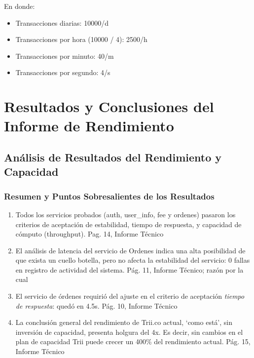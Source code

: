 \documentclass[
  paper=a4,
  ,captions=tableheading
]{scrartcl}
\providecommand{\tightlist}{%
  \setlength{\itemsep}{0pt}\setlength{\parskip}{0pt}}
\renewenvironment{quote}{\begin{customblockquote}\list{}{\rightmargin=0em\leftmargin=0em}%
\item\relax\color{blockquote-text}\ignorespaces}{\unskip\unskip\endlist\end{customblockquote}}
\begin{document}
En donde:

\begin{itemize}
\tightlist
\item
  Transacciones diarias: 10000/d
\item
  Transacciones por hora (10000 / 4): 2500/h
\item
  Transacciones por minuto: 40/m
\item
  Transacciones por segundo: 4/s
\end{itemize}

\newpage

\section{Resultados y Conclusiones del Informe de
Rendimiento}\label{sec:resultados-y-conclusiones-del-informe-de-rendimiento}

\subsection{Análisis de Resultados del Rendimiento y
Capacidad}\label{sec:anuxe1lisis-de-resultados-del-rendimiento-y-capacidad}

\begin{quote}
\end{quote}

\subsubsection{Resumen y Puntos Sobresalientes de los
Resultados}\label{sec:resumen-y-puntos-sobresalientes-de-los-resultados}

\begin{enumerate}
\def\labelenumi{\arabic{enumi}.}
\tightlist
\item
  Todos los servicios probados (auth, user\_info, fee y ordenes) pasaron
  los criterios de aceptación de estabilidad, tiempo de respuesta, y
  capacidad de cómputo (throughput). Pag. 14, Informe Técnico
\item
  El análisis de latencia del servicio de Ordenes indica una alta
  posibilidad de que exista un cuello botella, pero no afecta la
  estabilidad del servicio: 0 fallas en registro de actividad del
  sistema. Pág. 11, Informe Técnico; razón por la cual
\item
  El servicio de órdenes requirió del ajuste en el criterio de
  aceptación \emph{tiempo de respuesta}: quedó en 4.5s. Pág. 10, Informe
  Técnico
\item
  La conclusión general del rendimiento de Trii.co actual, `como está',
  sin inversión de capacidad, presenta holgura del 4x. Es decir, sin
  cambios en el plan de capacidad Trii puede crecer un 400\% del
  rendimiento actual. Pág. 15, Informe Técnico
\end{enumerate}
\end{document}
